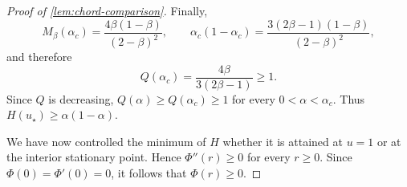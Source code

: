 \documentclass[10pt,a4paper]{amsart}
\begin{document}
\begin{proof}[Proof of \cref{lem:chord-comparison}]
Finally,
\[
  M_\beta(\alpha_c)=\frac{4\beta(1-\beta)}{(2-\beta)^2}, \qquad \alpha_c(1-\alpha_c)=\frac{3(2\beta-1)(1-\beta)}{(2-\beta)^2},
\]
and therefore
\[
  Q(\alpha_c)=\frac{4\beta}{3(2\beta-1)}\geq1.
\]
Since $Q$ is decreasing, $Q(\alpha)\geq Q(\alpha_c)\geq1$ for every $0<\alpha<\alpha_c$. Thus $H(u_\star)\geq\alpha(1-\alpha)$.

We have now controlled the minimum of $H$ whether it is attained at $u=1$ or at the interior stationary point. Hence $\Phi''(r)\geq0$ for every $r\geq0$. Since $\Phi(0)=\Phi'(0)=0$, it follows that $\Phi(r)\geq0$.
\end{proof}
\end{document}
